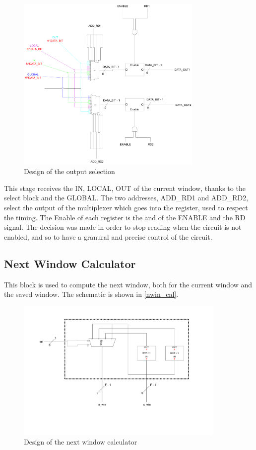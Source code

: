\begin{figure}[H]
  \centering
  \includegraphics[width=0.8\textwidth]{chapters/4_DecodeStage/images/output_choice.pdf}
  \caption{Design of the output selection}
  \label{output_choice}
\end{figure}

This stage receives the IN, LOCAL, OUT of the current window, thanks to the select block and the GLOBAL. The two addresses, ADD\_RD1 and ADD\_RD2, select the output of the multiplexer which goes into the register, used to respect the timing. The Enable of each register is the and of the ENABLE and the RD signal. The decision was made in order to stop reading when the circuit is not enabled, and so to have a granural and precise control of the circuit.

\subsection{Next Window Calculator}

This block is used to compute the next window, both for the current window and the saved window. The schematic is shown in \autoref{nwin_cal}.

\begin{figure}[H]
  \centering
  \includegraphics[width=0.9\textwidth]{chapters/4_DecodeStage/images/nwin_cal.pdf}
  \caption{Design of the next window calculator}
  \label{nwin_cal}
\end{figure}

